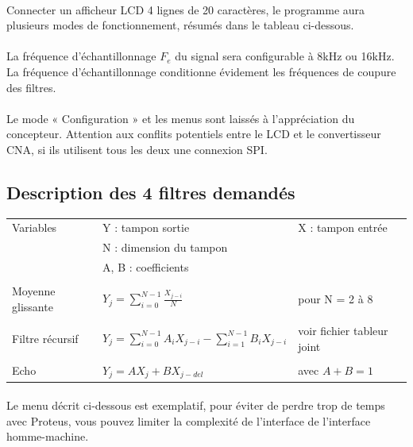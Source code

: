 \documentclass{article}
\begin{document}
    \paragraph{}
    Connecter un afficheur LCD 4 lignes de 20 caractères, le programme aura plusieurs modes de fonctionnement, résumés dans le tableau ci-dessous.
    
    \paragraph{}
    La fréquence d’échantillonnage $F_e$ du signal sera configurable à 8kHz ou 16kHz. La fréquence d’échantillonnage conditionne évidement les fréquences de coupure des filtres.

    \paragraph{}
    Le mode « Configuration » et les menus sont laissés à l’appréciation du concepteur. Attention aux conflits potentiels entre le LCD et le convertisseur CNA, si ils utilisent tous les deux une connexion SPI.

    \subsection{Description des 4 filtres demandés}

    \begin{tabular}{l l l} 
        Variables           & Y : tampon sortie & X : tampon entrée \\
                            & N : dimension du tampon & \\
                            & A, B : coefficients & \\
                            & & \\
        Moyenne glissante   & $Y_j = \sum\limits_{i=0}^{N-1} \frac{X_{j-i}}{N}$ & pour N = 2 à 8 \\
                            & & \\
        Filtre récursif     & $Y_j = \sum\limits_{i=0}^{N-1} A_i X_{j-i} - \sum\limits_{i=1}^{N-1} B_i X_{j-i}$ & voir fichier tableur joint \\
                            & & \\
        Echo                &  $Y_j = A X_j + B X_{j-del}$ & avec $A + B = 1$ \\
    \end{tabular}

    \paragraph{}
    Le menu décrit ci-dessous est exemplatif, pour éviter de perdre trop de temps avec Proteus, vous pouvez limiter la complexité de l’interface de l’interface homme-machine.
\end{document}
